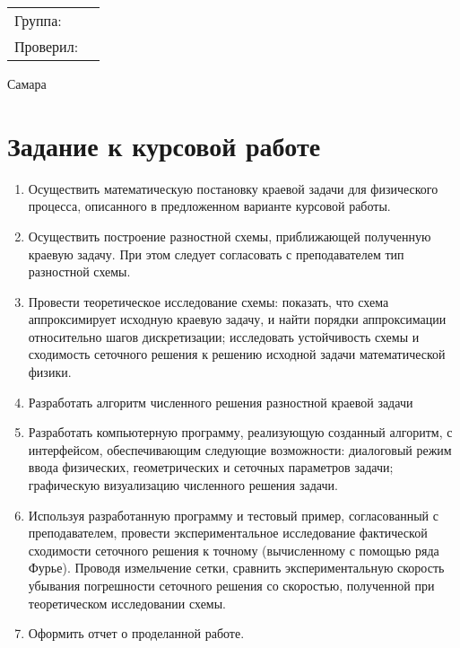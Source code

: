 \begin{titlepage}
\begin{minipage}{1\textwidth}
\begin{center}
\begin{tabularx}{\textwidth}{X l}
				Группа:                    & \groupNumber                     		           \\
				Проверил:                  & \teacherName         		                \\
			\end{tabularx}
		\end{center}
	\end{minipage}
							
						
							
	\vfill\vfill\vfill
					
	{\centering Самара \the\year}
							
							
\end{titlepage}


\setcounter{page}{2}



\section*{Задание к курсовой работе}
{
	\begin{enumerate}
	    \item Осуществить  математическую  постановку  краевой  задачи  для физического процесса, описанного в предложенном варианте курсовой работы.
        \item Осуществить построение разностной схемы, приближающей
полученную краевую задачу. При этом следует согласовать с преподавателем
тип разностной схемы.
        \item Провести теоретическое исследование схемы: показать, что схема
аппроксимирует исходную краевую задачу, и найти порядки аппроксимации
относительно шагов дискретизации; исследовать устойчивость схемы и
сходимость сеточного решения к решению исходной задачи математической
физики.
        \item Разработать алгоритм численного решения разностной краевой задачи
        \item Разработать компьютерную программу, реализующую созданный
алгоритм, с интерфейсом, обеспечивающим следующие возможности:
диалоговый режим ввода физических, геометрических и сеточных параметров
задачи; графическую визуализацию численного решения задачи.
        \item Используя разработанную программу и тестовый пример,
согласованный с преподавателем, провести экспериментальное исследование
фактической сходимости сеточного решения к точному (вычисленному с
помощью ряда Фурье). Проводя измельчение сетки, сравнить
экспериментальную скорость убывания погрешности сеточного решения со
скоростью, полученной при теоретическом исследовании схемы.
		\item Оформить отчет о проделанной работе.
	\end{enumerate}
}
\newpage

